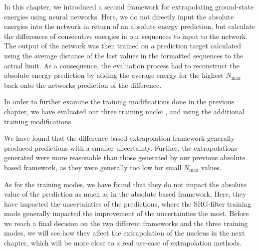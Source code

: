 In this chapter, we introduced a second framework for extrapolating ground-state energies using neural networks. Here, we do not directly input the absolute energies into the network in return of an absolute energy prediction, but calculate the differences of consecutive energies in our sequences to input to the network. The output of the network was then trained on a prediction target calculated using the average distance of the last values in the formatted sequences to the actual limit. As a consequence, the evaluation process had to reconstruct the absolute energy prediction by adding the average energy for the highest $N_\mathrm{max}$ back onto the networks prediction of the difference.

In order to further examine the training modifications done in the previous chapter, we have evaluated our three training nuclei ,  and  using the additional training modifications.

We have found that the difference based extrapolation framework generally produced predictions with a smaller uncertainty. Further, the extrapolations generated were more reasonable than those generated by our previous absolute based framework, as they were generally too low for small $N_\mathrm{max}$ values.

As for the training modes, we have found that they do not impact the absolute value of the prediction as much as in the absolute based framework. Here, they have impacted the uncertainties of the predictions, where the SRG-filter training mode generally impacted the improvement of the uncertainties the most.
Before we reach a final decision on the two different frameworks and the three training modes, we will see how they affect the extrapolation of the nucleus  in the next chapter, which will be more close to a real use-case of extrapolation methods.
